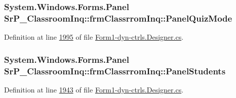 \hypertarget{class_sr_p___classroom_inq_1_1frm_classrrom_inq_a0dfa3465bc2680dd54dfeacc88b39bee}{
\subsubsection[{\-Panel\-Quiz\-Mode}]{\setlength{\rightskip}{0pt plus 5cm}\-System.\-Windows.\-Forms.\-Panel {\bf \-Sr\-P\-\_\-\-Classroom\-Inq\-::frm\-Classrrom\-Inq\-::\-Panel\-Quiz\-Mode}}}
\label{class_sr_p___classroom_inq_1_1frm_classrrom_inq_a0dfa3465bc2680dd54dfeacc88b39bee}


\-Definition at line \hyperlink{_form1-dyn-ctrls_8_designer_8cs_source_l01995}{1995} of file \hyperlink{_form1-dyn-ctrls_8_designer_8cs_source}{\-Form1-\/dyn-\/ctrls.\-Designer.\-cs}.

\hypertarget{class_sr_p___classroom_inq_1_1frm_classrrom_inq_a70fa7dcce9d5cbc3564066532704c216}{
\subsubsection[{\-Panel\-Students}]{\setlength{\rightskip}{0pt plus 5cm}\-System.\-Windows.\-Forms.\-Panel {\bf \-Sr\-P\-\_\-\-Classroom\-Inq\-::frm\-Classrrom\-Inq\-::\-Panel\-Students}}}
\label{class_sr_p___classroom_inq_1_1frm_classrrom_inq_a70fa7dcce9d5cbc3564066532704c216}


\-Definition at line \hyperlink{_form1-dyn-ctrls_8_designer_8cs_source_l01943}{1943} of file \hyperlink{_form1-dyn-ctrls_8_designer_8cs_source}{\-Form1-\/dyn-\/ctrls.\-Designer.\-cs}.

